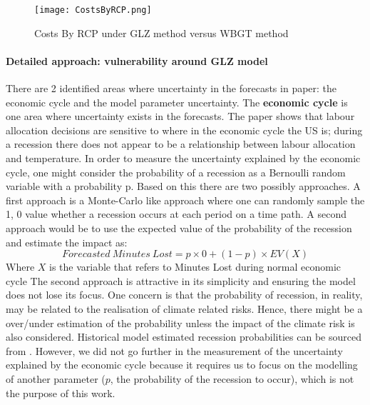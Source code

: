 \documentclass{article}
\begin{document}
\begin{figure}[h]
    \centering
    \texttt{[image: CostsByRCP.png]}
    \caption{Costs By RCP under GLZ method versus WBGT method}
    \label{fig:CostsByRCP}
\end{figure}



\paragraph{Detailed approach: vulnerability around GLZ model}

There are 2 identified areas where uncertainty in the forecasts in \cite{TemperatureAndWork:2021} paper: the economic cycle and the model parameter uncertainty.
\newline
The \textbf{economic cycle} is one area where uncertainty exists in the forecasts. 
The paper shows that labour allocation decisions are sensitive to where in the economic cycle the US is; during a recession there does not appear to be a relationship between labour allocation and temperature. In order to measure the uncertainty explained by the economic cycle, one might consider the probability of a recession as a Bernoulli random variable with a probability p. Based on this there are two possibly approaches. A first approach is a Monte-Carlo like approach where one can randomly sample the 1, 0 value whether a recession occurs at each period on a time path. A second approach would be to use the expected value of the probability of the recession and estimate the impact as: 
\begin{equation}
    \label{Eq:economiccycle}
    	Forecasted \ Minutes \ Lost = p \times 0 + (1-p) \times EV(X)
\end{equation}
Where $X$ is the variable that refers to Minutes Lost during normal economic cycle
The second approach is attractive in its simplicity and ensuring the model does not lose its focus. 
One concern is that the probability of recession, in reality, may be related to the realisation of climate related risks. Hence, there might be a over/under estimation of the probability unless the impact of the climate risk is also considered. Historical model estimated recession probabilities can be sourced from \cite{SmoothedU.S.RecessionProbabilities:2022}. However, we did not go further in the measurement of the uncertainty explained by the economic cycle because it requires us to focus on the modelling of another parameter ($p$, the probability of the recession to occur), which is not the purpose of this work. 
\end{document}
